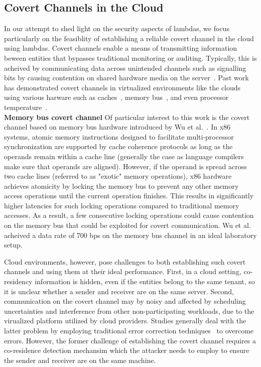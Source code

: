 \subsection{Covert Channels in the Cloud}
\label{sec:background:covertchannels}
In our attempt to shed light on the security aspects of lambdas, we focus
particularly on the feasiblity of establishing a reliable covert channel in the
cloud using lambdas.  Covert channels enable a means of transmitting information
beween entities that bypasses traditional monitoring or auditing. Typically,
this is acheived by communicating data across unintended channels such as
signalling bits by causing contention on shared hardware media on the
server~\cite{L2cacheCovertChannels,
ProcessorCovertChannels,ThermalCovertChannel,SshOverCovertChannel,wuusenix2012}.
Past work has demonstrated covert channels in virtualized environments like the
clouds using various harware such as
caches~\cite{ristenpartccs2009,L2cacheCovertChannels}, memory
bus~\cite{wuusenix2012}, and even processor
temperature~\cite{ThermalCovertChannel}. \\

\noindent \textbf{Memory bus covert channel} 
Of particular interest to this work is the covert channel based on memory bus 
hardware introduced by Wu et al.~\cite{wuusenix2012}. 
In x86 systems, atomic memory instructions designed to facilitate 
multi-processor synchronization are supported by cache coherence protocols as
long as the operands remain within a cache line (generally the case as language
compilers make sure that operands are aligned). However, if the operand is
spread across two cache lines (referred to as "exotic" memory operations), x86
hardware achieves atomicity by locking the memory bus to prevent any other
memory access operations until the current operation finishes. This results in
significantly higher latencies for such locking operations compared to traditional 
memory accesses. As a result, a few consecutive locking operations could cause 
contention on the memory bus that could be exploited for covert communication.
Wu et al. acheived a data rate of 700 bps on the memory bus channel in an 
ideal laboratory setup.

Cloud environments, however, pose challenges to both establishing such covert
channels and using them at their ideal performance. First, in a cloud setting,
co-residency information is hidden, even if the entities belong to the same
tenant, so it is unclear whether a sender and receiver are on the same server.
Second, communication on the covert channel may by noisy and affected by
scheduling uncertainties and interference from other non-participating
workloads, due to the virualized platform utilized by cloud providers.  Studies
generally deal with the latter problem by employing traditional error correction
techniques~\cite{wuusenix2012} to overcome errors.  However, the former
challenge of establishing the covert channel requires a co-residence detection
mechansim which the attacker needs to employ to ensure the sender and receiver
are on the same machine. 


